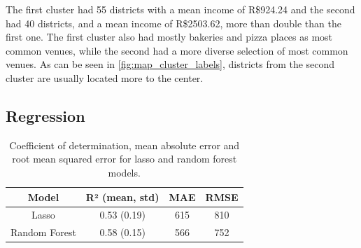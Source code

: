 \documentclass[12pt]{article}
\begin{document}
\newpage

The first cluster had 55 districts with a mean income of R\$924.24 and the
second had 40 districts, and a mean income of R\$2503.62, more than double than
the first one. The first cluster also had mostly bakeries and pizza places as
most common venues, while the second had a more diverse selection of most
common venues. As can be seen in \autoref{fig:map_cluster_labels}, districts
from the second cluster are usually located more to the center.



\subsection{Regression}

\begin{table}[h]
        \centering
        \begin{tabular}[c]{ c c c c }
                \toprule
                Model & R² (mean, std) & MAE & RMSE \\
                \midrule
                Lasso & 0.53 (0.19) & 615 & 810 \\
                Random Forest & 0.58 (0.15) & 566 & 752 \\                \bottomrule
        \end{tabular}
        \caption{Coefficient of determination, mean absolute error and root
        mean squared error for lasso and random forest
        models.\label{tab:models}}
\end{table}
\end{document}
